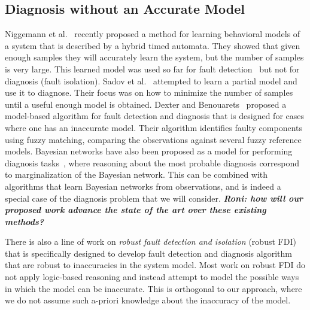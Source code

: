 \documentclass[12pt]{article}
\newcommand{\note}[1]{\textbf{\textit{#1}}}
\begin{document}
\subsection{Diagnosis without an Accurate Model}
Niggemann et al.~\cite{niggemann2012learning} recently proposed a method for learning behavioral models of a system that is described by a hybrid timed automata. They showed that given enough samples they will accurately learn the system, but the number of samples is very large. This learned model was used so far for fault detection~\cite{niggemann2012learning} but not for diagnosis (fault isolation). Sadov et al.~\cite{sadov2010towards} attempted to learn a partial model and use it to diagnose. Their focus was on how to minimize the number of samples until a useful enough model is obtained. 
Dexter and Benouarets~\cite{dexter1997model} proposed a model-based algorithm for fault detection and diagnosis that is designed for cases where one has an inaccurate model. Their algorithm identifies faulty components using fuzzy matching, comparing the observations against several fuzzy reference models. Bayesian networks have also been proposed as a model for performing diagnosis tasks~\cite{darwiche2009modeling,el1995diagnosing}, where reasoning about the most probable diagnosis correspond to marginalization of the Bayesian network. This can be combined with algorithms that learn Bayesian networks from observations, and is indeed a special case of the diagnosis problem that we will consider.  \note{Roni: how will our proposed work advance the state of the art over these existing methods?}

There is also a line of work on {\em robust fault detection and isolation} (robust FDI)~\cite{chen2012robust,frank1997survey} that is specifically designed to develop fault detection and diagnosis algorithm that are robust to inaccuracies in the system model. Most work on robust FDI do not apply logic-based reasoning and instead attempt to model the possible ways in which the model can be inaccurate. This is orthogonal to our approach, where we do not assume such a-priori knowledge about the inaccuracy of the model.  




\end{document}
